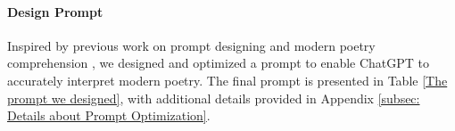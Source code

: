 \documentclass[11pt]{article}
\begin{document}
\paragraph{Design Prompt}




Inspired by previous work on prompt designing \cite{jiao2023chatgpt,gao2023design} and modern poetry comprehension \cite{ZhangTaozhou2021How}, we designed and optimized a prompt to enable ChatGPT to accurately interpret modern poetry. The final prompt is presented in Table \ref{The prompt we designed}, with additional details provided in Appendix \ref{subsec: Details about Prompt Optimization}.





\end{document}
